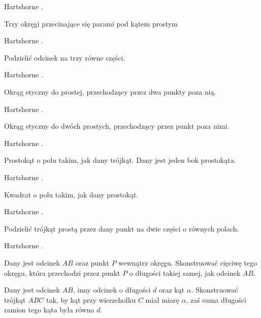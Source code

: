 Hartshorne \cite[s. 25]{hartshorne2000}.

\begin{problem}
    Trzy okręgi przecinające się parami pod kątem prostym
\end{problem} %

Hartshorne \cite[s. 25]{hartshorne2000}.

\begin{problem}
    Podzielić odcinek na trzy równe części.
\end{problem} %

Hartshorne \cite[s. 25]{hartshorne2000}.


\begin{problem}
    Okrąg styczny do prostej, przechodzący przez dwa punkty poza nią.
\end{problem}

Hartshorne \cite[s. 43]{hartshorne2000}.

\begin{problem}
    Okrąg styczny do dwóch prostych, przechodzący przez punkt poza nimi.
\end{problem}

Hartshorne \cite[s. 44]{hartshorne2000}.


\begin{problem}
    Prostokąt o polu takim, jak dany trójkąt.
    Dany jest jeden bok prostokąta.
\end{problem}
Hartshorne \cite[s. 43]{hartshorne2000}.

\begin{problem}
    Kwadrat o polu takim, jak dany prostokąt.
\end{problem}
Hartshorne \cite[s. 43]{hartshorne2000}.


\begin{problem}
    Podzielić trójkąt prostą przez dany punkt na dwie części o równych polach.
\end{problem}
Hartshorne \cite[s. 44]{hartshorne2000}.




\begin{problem}
    Dany jest odcinek $AB$ oraz punkt $P$ wewnątrz okręgu.
    Skonstruować cięciwę tego okręgu, która przechodzi przez punkt $P$ o długości takiej samej, jak odcinek $AB$.
\end{problem} %

\begin{problem}
    Dany jest odcinek $AB$, inny odcinek o długości $d$ oraz kąt $\alpha$.
    Skonstruować trójkąt $ABC$ tak, by kąt przy wierzchołku $C$ miał miarę $\alpha$, zaś suma długości ramion tego kąta była równa $d$.
\end{problem} %

